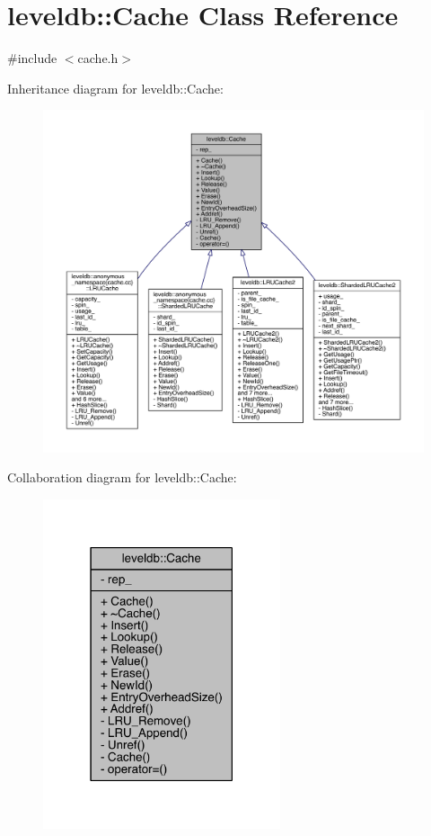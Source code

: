 \hypertarget{classleveldb_1_1_cache}{}\section{leveldb\+:\+:Cache Class Reference}
\label{classleveldb_1_1_cache}


{\ttfamily \#include $<$cache.\+h$>$}



Inheritance diagram for leveldb\+:\+:Cache\+:
\nopagebreak
\begin{figure}[H]
\begin{center}
\leavevmode
\includegraphics[width=350pt]{classleveldb_1_1_cache__inherit__graph}
\end{center}
\end{figure}


Collaboration diagram for leveldb\+:\+:Cache\+:\nopagebreak
\begin{figure}[H]
\begin{center}
\leavevmode
\includegraphics[width=198pt]{classleveldb_1_1_cache__coll__graph}
\end{center}
\end{figure}
